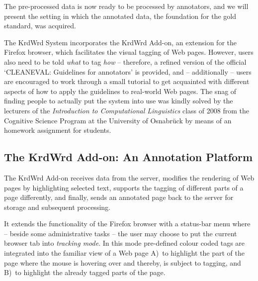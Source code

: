 \begin{longversion}
%
%
The pre-processed data is now ready to be processed by annotators, and we will present the setting in which the annotated data, the foundation for the gold standard, was acquired.

The KrdWrd System incorporates the KrdWrd Add-on, an extension for the Firefox browser, which facilitates the visual tagging of Web pages. 
However, users also need to be told \emph{what} to tag \emph{how} -- therefore, a refined version of the official `CLEANEVAL: Guidelines for annotators' \cite{cleaneval/annotation_guidelines} is provided, and -- additionally -- users are encouraged to work through a small tutorial to get acquainted with different aspects of how to apply the guidelines to real-world Web pages.
The snag of finding people to actually put the system into use was kindly solved by the lecturers of the \emph{Introduction to Computational Linguistics} class of 2008 from the Cognitive Science Program at the University of Osnabr\"{u}ck by means of an homework assignment for students.


\subsection{\label{sec:addon}The KrdWrd Add-on: An Annotation Platform}
The KrdWrd Add-on receives data from the server, modifies the rendering of Web pages by highlighting selected text, supports the tagging of different parts of a page differently, and finally, sends an annotated page back to the server for storage and subsequent processing.

It extends the functionality of the Firefox browser with a status-bar menu where -- beside some administrative tasks -- the user may choose to put the current browser tab into \textit{tracking mode}.
In this mode pre-defined colour coded tags are integrated into the familiar view of a Web page
A)~to highlight the part of the page where the mouse is hovering over and thereby, is subject to tagging, and
B)~to highlight the already tagged parts of the page.


\end{longversion}
